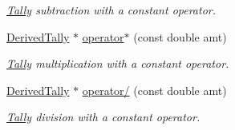\begin{DoxyCompactItemize}
\begin{DoxyCompactList}\small\item\em \hyperlink{classTally}{Tally} subtraction with a constant operator. \end{DoxyCompactList}\item 
\hyperlink{classDerivedTally}{Derived\-Tally} $\ast$ \hyperlink{classTally_a05b8241d523d1205317214ec5236a613}{operator$\ast$} (const double amt)
\begin{DoxyCompactList}\small\item\em \hyperlink{classTally}{Tally} multiplication with a constant operator. \end{DoxyCompactList}\item 
\hyperlink{classDerivedTally}{Derived\-Tally} $\ast$ \hyperlink{classTally_ab0a24883876b8ac95fd0c0cb36369aa7}{operator/} (const double amt)
\begin{DoxyCompactList}\small\item\em \hyperlink{classTally}{Tally} division with a constant operator. \end{DoxyCompactList}\end{DoxyCompactItemize}
